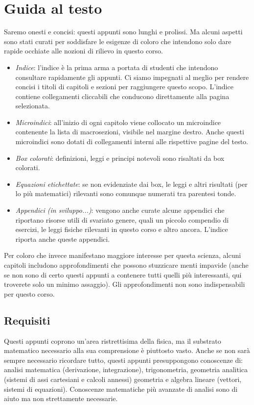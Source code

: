 \chapter*{Guida al testo}
Saremo onesti e concisi: questi appunti sono lunghi e prolissi.
Ma alcuni aspetti sono stati curati per soddisfare le esigenze di
coloro che intendono solo dare rapide occhiate alle nozioni di rilievo
in questo corso.

\begin{itemize}
    \item \textit{Indice}: l'indice è la prima arma a portata di studenti che intendono
    consultare rapidamente gli appunti. Ci siamo impegnati al meglio per rendere
    concisi i titoli di capitoli e sezioni per raggiungere questo scopo. L'indice
    contiene collegamenti cliccabili che conducono direttamente alla pagina selezionata.

    \item \textit{Microindici}: all'inizio di ogni capitolo viene collocato un microindice
    contenente la lista di macrosezioni, visibile nel margine destro. Anche questi microindici
    sono dotati di collegamenti interni alle rispettive pagine del testo.

    \item \textit{Box colorati}: definizioni, leggi e principi notevoli sono risaltati da box colorati.
    
    \item \textit{Equazioni etichettate}: se non evidenziate dai box, le leggi e altri
    risultati (per lo più matematici) rilevanti sono comunque numerati tra
    parentesi tonde.

    \item \textit{Appendici (in sviluppo...)}: vengono anche curate alcune appendici
    che riportano risorse utili di svariato genere, quali un piccolo compendio di esercizi,
    le leggi fisiche rilevanti in questo corso e altro ancora. L'indice riporta anche
    queste appendici.
\end{itemize}

Per coloro che invece manifestano maggiore interesse per questa scienza, alcuni
capitoli includono approfondimenti che possono stuzzicare menti impavide (anche
se non sono di certo questi appunti a contenere tutti quelli più interessanti,
qui troverete solo un minimo assaggio). Gli approfondimenti non sono
indispensabili per questo corso.

\section*{Requisiti}
Questi appunti coprono un'area ristrettisima della fisica, ma il substrato
matematico necessario alla sua comprensione è piuttosto vasto. Anche
se non sarà sempre necessario ricordare tutto,
questi appunti presuppongono conoscenze di: analisi matematica (derivazione,
integrazione), trigonometria, geometria analitica (sistemi di assi
cartesiani e calcoli annessi) geometria e algebra lineare (vettori,
sistemi di equazioni). Conoscenze matematiche più avanzate di analisi
sono di aiuto ma non strettamente necessarie.

